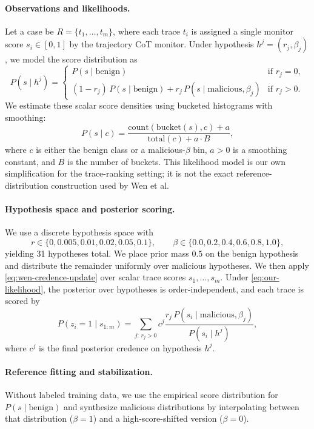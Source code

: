 \documentclass{article} %
\begin{document}
\paragraph{Observations and likelihoods.}
Let a case be $R = \{t_1,\dots,t_m\}$, where each trace $t_i$ is assigned a
single monitor score $s_i \in [0,1]$ by the trajectory CoT monitor. Under hypothesis
$h^j = (r_j,\beta_j)$, we model the score distribution as
\begin{equation}
\label{eq:our-likelihood}
P(s \mid h^j)
=
\begin{cases}
P(s \mid \mathrm{benign}) & \text{if } r_j = 0,\\
(1-r_j)\,P(s \mid \mathrm{benign})
+
r_j\,P(s \mid \mathrm{malicious}, \beta_j) & \text{if } r_j > 0.
\end{cases}
\end{equation}
We estimate these scalar score densities using bucketed histograms with
smoothing:
\begin{equation}
P(s \mid c)
=
\frac{\mathrm{count}(\mathrm{bucket}(s), c) + a}
{\mathrm{total}(c) + a \cdot B},
\end{equation}
where $c$ is either the benign class or a malicious-$\beta$ bin, $a>0$ is a
smoothing constant, and $B$ is the number of buckets. This likelihood model is
our own simplification for the trace-ranking setting; it is not the exact
reference-distribution construction used by Wen et al.

\paragraph{Hypothesis space and posterior scoring.}
We use a discrete hypothesis space with
\[
r \in \{0, 0.005, 0.01, 0.02, 0.05, 0.1\},
\qquad
\beta \in \{0.0, 0.2, 0.4, 0.6, 0.8, 1.0\},
\]
yielding 31 hypotheses total. We place prior mass $0.5$ on the benign
hypothesis and distribute the remainder uniformly over malicious hypotheses.
We then apply \cref{eq:wen-credence-update} over scalar trace
scores $s_1,\dots,s_m$. Under \cref{eq:our-likelihood}, the posterior
over hypotheses is order-independent, and each trace is scored by
\begin{equation}
\label{eq:per-trace-posterior}
P(z_i = 1 \mid s_{1:m})
=
\sum_{j:\, r_j > 0}
c^j
\frac{r_j\,P(s_i \mid \mathrm{malicious}, \beta_j)}
{P(s_i \mid h^j)},
\end{equation}
where $c^j$ is the final posterior credence on hypothesis $h^j$.

\paragraph{Reference fitting and stabilization.}
Without labeled training data, we use the empirical score distribution for $P(s \mid \mathrm{benign})$ and synthesize malicious distributions by interpolating between that distribution ($\beta=1$) and a high-score-shifted version ($\beta=0$). 
\end{document}
